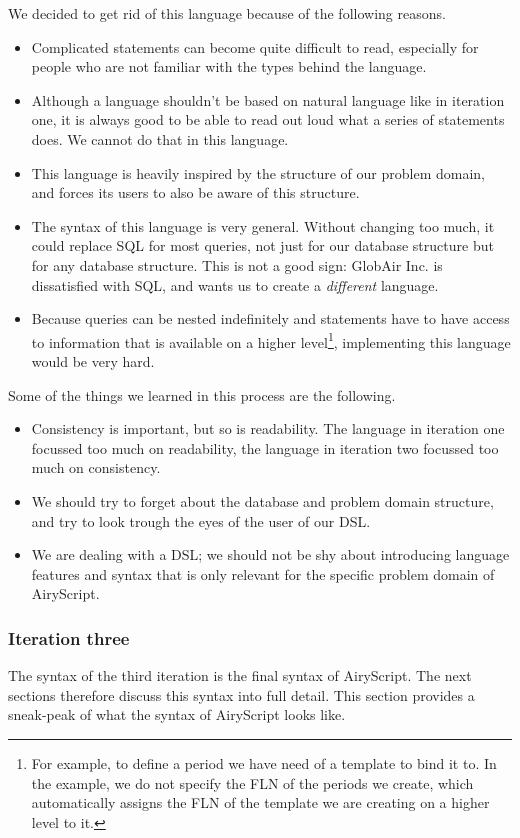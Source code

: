 We decided to get rid of this language because of the following reasons.
\begin{itemize}
  \item Complicated statements can become quite difficult to read, especially
    for people who are not familiar with the types behind the language.
  \item Although a language shouldn’t be based on natural language like in
    iteration one, it is always good to be able to read out loud what a series
    of statements does. We cannot do that in this language.
  \item This language is heavily inspired by the structure of our problem
    domain, and forces its users to also be aware of this structure.
  \item The syntax of this language is very general. Without changing too much,
    it could replace SQL for most queries, not just for our database structure
    but for any database structure. This is not a good sign: GlobAir Inc.  is
    dissatisfied with SQL, and wants us to create a \emph{different}
    language.
  \item Because queries can be nested indefinitely and statements have to have
    access to information that is available on a higher level\footnote{For
      example, to define a period we have need of a template to bind it to. In
      the example, we do not specify the FLN of the periods we create, which
      automatically assigns the FLN of the template we are creating on a higher
      level to it.},
    implementing this language would be very hard.
\end{itemize}
Some of the things we learned in this process are the following.
\begin{itemize}
  \item Consistency is important, but so is readability. The language in
    iteration one focussed too much on readability, the language in iteration
    two focussed too much on consistency.
  \item We should try to forget about the database and problem domain structure,
    and try to look trough the eyes of the user of our DSL.
  \item We are dealing with a DSL; we should not be shy about introducing
    language features and syntax that is only relevant for the specific problem
    domain of AiryScript.
\end{itemize}

\subsubsection{Iteration three}
The syntax of the third iteration is the final syntax of AiryScript. The next
sections therefore discuss this syntax into full detail. This section provides a
sneak-peak of what the syntax of AiryScript looks like.

